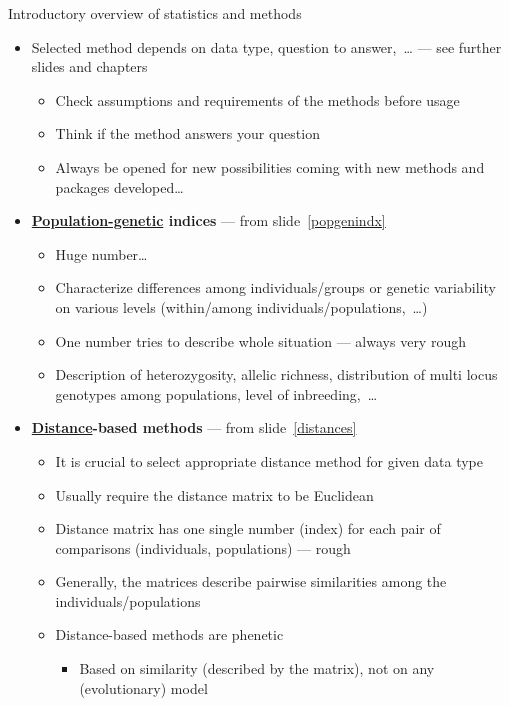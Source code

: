 \documentclass[compress, xelatex, 11pt, xcolor=svgnames, aspectratio=169,
	hyperref={
		bookmarks=true,
		unicode=true,
		colorlinks=true,
		pdftitle={Molecular data in R},
		plainpages=false,
		pdfauthor={Vojtech Zeisek},
		pdfsubject={Course about phylogeny and evolution in R},
		pdfcreator={XeLaTeX},
		pdfkeywords={R, evolution, phylogeny, molecular data},
		linkcolor=Crimson, %
		anchorcolor=Magenta, %
		citecolor=Magenta, %
		filecolor=Magenta, %
		menucolor=Magenta, %
		urlcolor=DodgerBlue, %
		},
	url={hyphens, lowtilde} %
	]{beamer}
\begin{document}
\begin{frame}[allowframebreaks]{Introductory overview of statistics and methods}
	\begin{itemize}
		\item \alert{Selected method depends on data type, question to answer,~\ldots}{ }--- see further slides and chapters
		\begin{itemize}
			\item Check assumptions and requirements of the methods before usage
			\item Think if the method answers your question
			\item Always be opened for new possibilities coming with new methods and packages developed\ldots
		\end{itemize}
		\item \textbf{\href{https://en.wikipedia.org/wiki/Population_genetics}{Population-genetic} indices} --- from slide~\ref{popgenindx}
		\begin{itemize}
			\item Huge number\ldots
			\item Characterize differences among individuals/groups or genetic variability on various levels (within/among individuals/populations,~\ldots)
			\item One number tries to describe whole situation --- always very rough
			\item Description of heterozygosity, allelic richness, distribution of multi locus genotypes among populations, level of inbreeding,~\ldots
		\end{itemize}
		\item \textbf{\href{https://en.wikipedia.org/wiki/Genetic_distance}{Distance}-based methods} --- from slide~\ref{distances}
		\begin{itemize}
			\item \alert{It is crucial to select appropriate distance method for given data type}
			\item Usually require the distance matrix to be Euclidean
			\item Distance matrix has one single number (index) for each pair of comparisons (individuals, populations) --- rough
			\item Generally, the matrices describe pairwise similarities among the individuals/populations
			\item Distance-based methods are phenetic
			\begin{itemize}
				\item Based on similarity (described by the matrix), not on any (evolutionary) model

\end{itemize}
\end{itemize}
\end{itemize}
\end{frame}
\end{document}

